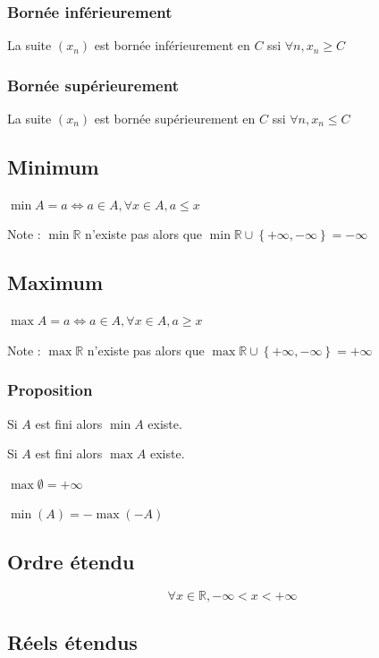 \documentclass[a4paper,10pt]{article}
\newcommand{\R}{\mathbb{R}}
\newcommand{\ioi}{\Leftrightarrow}
\newcommand{\tset}[1]{\left\lbrace #1 \right\rbrace}
\begin{document}
\subsubsection{Bornée inférieurement}

La suite $(x_n)$ est bornée inférieurement en $C$ ssi $\forall n, x_n \geq C$

\subsubsection{Bornée supérieurement}

La suite $(x_n)$ est bornée supérieurement en $C$ ssi $\forall n, x_n \leq C$

\subsection{Minimum}
$\min A = a \ioi a \in A, \forall x \in A, a \leq x$

Note : $\min \R$ n'existe pas alors que $\min \R \cup \tset{+\infty, -\infty} = -\infty$

\subsection{Maximum}

$\max A = a \ioi a \in A, \forall x \in A, a \geq x$

Note : $\max \R$ n'existe pas alors que $\max \R \cup \tset{+\infty, -\infty} = +\infty$

\subsubsection{Proposition}

Si $A$ est fini alors $\min A$ existe.

Si $A$ est fini alors $\max A$ existe.

$\max \emptyset = +\infty$

$\min(A) = -\max(-A)$

\subsection{Ordre étendu}

$$\forall x \in \R, -\infty < x < +\infty$$

\subsection{Réels étendus}
\end{document}
